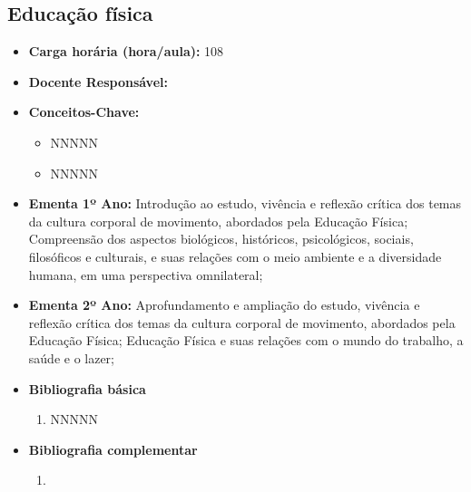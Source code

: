 \documentclass[11pt,fleqn]{book} %
\begin{document}
\subsection{Educação física}\label{disc:educacaofisica}
\begin{itemize}
	\item \textbf{Carga horária (hora/aula):} 108
	\item \textbf{Docente Responsável:}
	\item \textbf{Conceitos-Chave:}
	\begin{itemize}
		\item NNNNN
		\item NNNNN
	\end{itemize}
	\item \textbf{Ementa 1º Ano:} 
	Introdução ao estudo, vivência e reflexão crítica dos temas da cultura corporal de movimento, abordados pela Educação Física;
	Compreensão dos aspectos biológicos, históricos, psicológicos, sociais, filosóficos e culturais, e suas relações com o meio ambiente e a diversidade humana, em uma perspectiva omnilateral;
	
	\item \textbf{Ementa 2º Ano:} 
	Aprofundamento e ampliação do estudo, vivência e reflexão crítica dos temas da cultura corporal de movimento, abordados pela Educação Física;
	Educação Física e suas relações com o mundo do trabalho, a saúde e o lazer;	
	\item \textbf{Bibliografia básica}
	\begin{enumerate}
		\item NNNNN
	\end{enumerate}
	\item \textbf{Bibliografia complementar}
	\begin{enumerate}
		\item 
	\end{enumerate}	
\end{itemize}

\newpage
\end{document}
